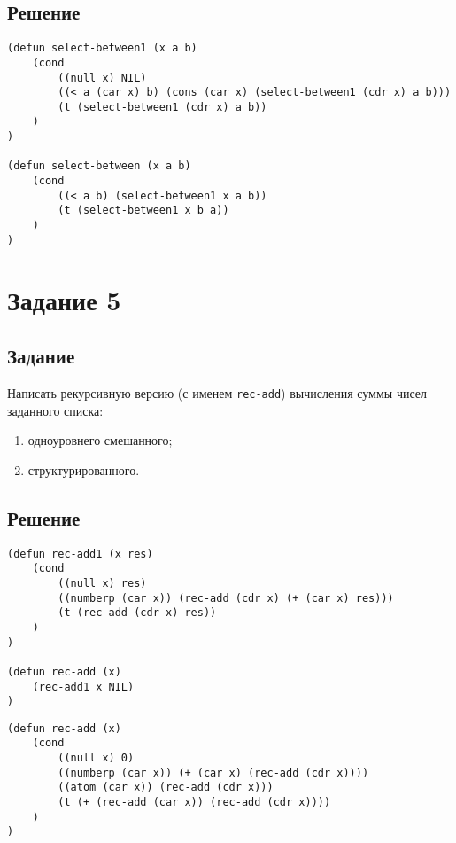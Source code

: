 \subsection*{Решение}
\begin{code}
\begin{verbatim}
(defun select-between1 (x a b)
    (cond 
        ((null x) NIL)
        ((< a (car x) b) (cons (car x) (select-between1 (cdr x) a b)))
        (t (select-between1 (cdr x) a b))
    )
)

(defun select-between (x a b)
    (cond 
        ((< a b) (select-between1 x a b))
        (t (select-between1 x b a))
    )
)
\end{verbatim}
\end{code}


\section{Задание 5}
\subsection*{Задание}
Написать рекурсивную версию (с именем \texttt{rec-add}) вычисления суммы чисел заданного списка:

\begin{enumerate}
    \item одноуровнего смешанного;
    \item структурированного.
\end{enumerate}

\subsection*{Решение}
\begin{code}
\begin{verbatim}
(defun rec-add1 (x res)
    (cond
        ((null x) res)
        ((numberp (car x)) (rec-add (cdr x) (+ (car x) res)))
        (t (rec-add (cdr x) res))
    )
)

(defun rec-add (x)
	(rec-add1 x NIL)
)
\end{verbatim}
\end{code}

\begin{code}
\begin{verbatim}
(defun rec-add (x)
    (cond
        ((null x) 0)
        ((numberp (car x)) (+ (car x) (rec-add (cdr x))))
        ((atom (car x)) (rec-add (cdr x)))
        (t (+ (rec-add (car x)) (rec-add (cdr x))))
    )
)
\end{verbatim}
\end{code}

\newpage